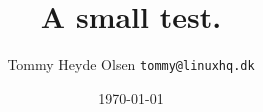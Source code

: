 \documentclass[a4paper, 12pt, danish]{article}
\author{Tommy Heyde Olsen \tt{tommy@linuxhq.dk}}
\date{\today}
\title{A small test.}
\begin{document}
\maketitle{}
\clearpage
\end{document}
